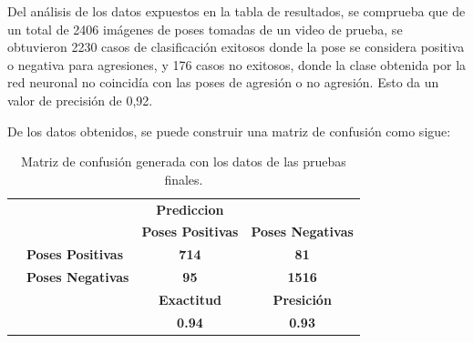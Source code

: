 \documentclass[a4paper,12pt,oneside,spanish]{book}
\begin{document}
Del análisis de los datos expuestos en la tabla de resultados, se comprueba que de un total de 2406 imágenes de poses tomadas de un video de prueba, se obtuvieron 2230 casos de clasificación exitosos donde la pose se considera positiva o negativa para agresiones, y 176 casos no exitosos, donde la clase obtenida por la red neuronal no coincidía con las poses de agresión o no agresión. Esto da un valor de precisión de 0,92.\par

De los datos obtenidos, se puede construir una matriz de confusión como sigue:\par
\vspace*{1cm}
\begin{table}[htbp]
	\centering
	\footnotesize
	\begin{tabular}{rrcc}
		\rowcolor[rgb]{ .827,  .953,  .988} \textcolor[rgb]{ .729,  .71,  .671}{} & \multicolumn{3}{c}{\cellcolor[rgb]{ .886,  .984,  .984}\textcolor[rgb]{ .729,  .71,  .671}{\textbf{Prediccion}}} \\[1ex]
		\rowcolor[rgb]{ .827,  .953,  .988} \textcolor[rgb]{ .729,  .71,  .671}{} & \textcolor[rgb]{ .255,  .243,  .212}{} & \multicolumn{1}{p{5.355em}}{\cellcolor[rgb]{ .784,  .941,  .984}\textcolor[rgb]{ .255,  .243,  .212}{\textbf{Poses Positivas}}} & \multicolumn{1}{p{5.355em}}{\cellcolor[rgb]{ .784,  .941,  .984}\textcolor[rgb]{ .255,  .243,  .212}{\textbf{Poses Negativas}}} \\[2ex]
		\rowcolor[rgb]{ .827,  .953,  .988} \multicolumn{1}{c}{\multirow{2}[0]{*}{\textcolor[rgb]{ .729,  .71,  .671}{\rotatebox{90}{\textbf{Real}}}}} & \multicolumn{1}{l}{\textcolor[rgb]{ .255,  .243,  .212}{\textbf{Poses Positivas}}} & \cellcolor[rgb]{ 1,  1,  1}\textcolor[rgb]{ .255,  .243,  .212}{\textbf{714}} & \cellcolor[rgb]{ 1,  1,  1}\textcolor[rgb]{ .255,  .243,  .212}{\textbf{81}} \\[2ex]
		\rowcolor[rgb]{ .827,  .953,  .988}       & \multicolumn{1}{l}{\textcolor[rgb]{ .255,  .243,  .212}{\textbf{Poses Negativas}}} & \cellcolor[rgb]{ 1,  1,  1}\textcolor[rgb]{ .255,  .243,  .212}{\textbf{95}} & \cellcolor[rgb]{ 1,  1,  1}\textcolor[rgb]{ .255,  .243,  .212}{\textbf{1516}} \\[2ex]
		\rowcolor[rgb]{ .827,  .953,  .988}       & \textcolor[rgb]{ .255,  .243,  .212}{} & \textcolor[rgb]{ .255,  .243,  .212}{\textbf{Exactitud}} & \textcolor[rgb]{ .255,  .243,  .212}{\textbf{Presición}} \\[1ex]
		\rowcolor[rgb]{ .827,  .953,  .988}  	  & \textcolor[rgb]{ .729,  .71,  .671}{} & \cellcolor[rgb]{ 1,  1,  1}\textcolor[rgb]{.255,  .243,  .212}{\textbf{0.94}} & \cellcolor[rgb]{ 1,  1,  1}\textcolor[rgb]{.255,  .243,  .212}{\textbf{0.93}} \\[1ex]
	\end{tabular}%
	\caption{Matriz de confusión generada con los datos de las pruebas finales.}
	\label{tab:addlabel}%
\end{table}%
\end{document}
